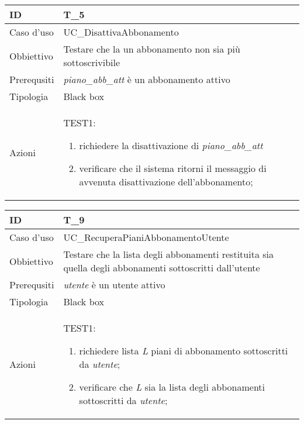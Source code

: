 \begin{table}[hb]
    \centering
    \begin{tabular}{ |p{2cm}|p{10cm}|  }
        \hline
        ID & T\_5 \\\hline
        Caso d'uso & UC\_DisattivaAbbonamento \\\hline   
        Obbiettivo & Testare che la un abbonamento non sia più sottoscrivibile  \\\hline
        Prerequsiti & \emph{piano\_abb\_att} è un abbonamento attivo \\\hline
        Tipologia & Black box \\\hline
        Azioni & 
        TEST1:
        \begin{enumerate}[topsep=0pt]
            \item richiedere la disattivazione di \emph{piano\_abb\_att}
            \item verificare che il sistema ritorni il messaggio di avvenuta disattivazione dell'abbonamento;
        \end{enumerate}
        \\\hline
    \end{tabular}
\end{table}


\begin{table}[hb]
    \centering
    \begin{tabular}{ |p{2cm}|p{10cm}|  }
        \hline
        ID & T\_9 \\\hline
        Caso d'uso & UC\_RecuperaPianiAbbonamentoUtente \\\hline   
        Obbiettivo & Testare che la lista degli abbonamenti restituita sia quella degli abbonamenti
        sottoscritti dall'utente \\\hline
        Prerequsiti & \emph{utente} è un utente attivo \\\hline
        Tipologia & Black box \\\hline
        Azioni & 
        TEST1:
        \begin{enumerate}[topsep=0pt]
            \item richiedere lista \emph{L} piani di abbonamento sottoscritti da \emph{utente};
            \item verificare che \emph{L} sia la lista degli abbonamenti sottoscritti da \emph{utente};
        \end{enumerate}
        \\\hline
    \end{tabular}
\end{table}


